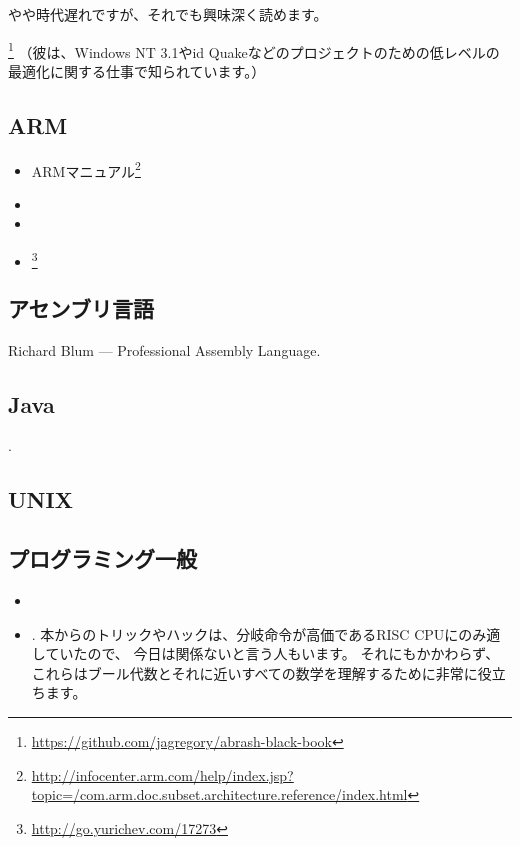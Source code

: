 やや時代遅れですが、それでも興味深く読めます。

\MAbrash\footnote{\AlsoAvailableAs \url{https://github.com/jagregory/abrash-black-book}}
（彼は、Windows NT 3.1やid Quakeなどのプロジェクトのための低レベルの最適化に関する仕事で知られています。）

\subsection{ARM}

\begin{itemize}
\item ARMマニュアル\footnote{\AlsoAvailableAs \url{http://infocenter.arm.com/help/index.jsp?topic=/com.arm.doc.subset.architecture.reference/index.html}}

\item \ARMSevenRef

\item \ARMSixFourRefURL

\item \ARMCookBook\footnote{\AlsoAvailableAs \url{http://go.yurichev.com/17273}}
\end{itemize}

\subsection{アセンブリ言語}

Richard Blum --- Professional Assembly Language.

\subsection{Java}

\JavaBook.

\subsection{UNIX}

\TAOUP

\subsection{プログラミング一般}

\begin{itemize}

\item \RobPikePractice

\item \HenryWarren.
本からのトリックやハックは、分岐命令が高価である\ac{RISC} \ac{CPU}にのみ適していたので、
今日は関係ないと言う人もいます。 
それにもかかわらず、これらはブール代数とそれに近いすべての数学を理解するために非常に役立ちます。

\end{itemize}

